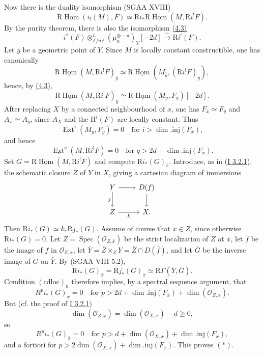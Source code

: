 \documentclass[11pt]{article}
\providecommand{\uH}{\underline{\mathrm H}}
\DeclareMathOperator{\Hom}{Hom}
\DeclareMathOperator{\Ext}{Ext}
\DeclareMathOperator{\Spec}{Spec}
\newcommand{\R}{\mathrm{R}}
\newcommand{\Z}{\mathbb{Z}}
\providecommand{\Hom}{\operatorname{Hom}}
\providecommand{\R}{\mathrm R}
\providecommand{\Z}{\mathbb Z}
\providecommand{\Spec}{\operatorname{Spec}}
\providecommand{\Spec}{\operatorname{Spec}}
\providecommand{\Hom}{\operatorname{Hom}}
\providecommand{\Spec}{\operatorname{Spec}}
\providecommand{\Spec}{\operatorname{Spec}}
\begin{document}
Now there is the duality isomorphism (SGAA XVIII)
\[
        \R\underline{\Hom}(i_!(M),F)\simeq \R i_*\R\underline{\Hom}(M,\R i^!F).
\]
By the purity theorem, there is also the isomorphism \hyperref[sga5:I:equation:4.3]{(4.3)}
\[
        i^*(F)\otimes^L_{\Z/n\Z}(\mu_n^{\otimes -d})_Y[-2d]\xrightarrow{\sim}\R i^!(F).
\]
Let $\bar{y}$ be a geometric point of $Y$. Since $M$ is locally constant constructible, one has canonically
\[
        \R\underline{\Hom}(M,\R i^!F)_{\bar{y}}\simeq \R\underline{\Hom}(M_{\bar{y}},(\R i^!F)_{\bar{y}}),
\]
hence, by \hyperref[sga5:I:equation:4.3]{(4.3)},
\[
        \R\underline{\Hom}(M,\R i^!F)_{\bar{y}}\simeq \R\underline{\Hom}(M_{\bar{y}},F_{\bar{y}})[-2d].
\]
After replacing $X$ by a connected neighbourhood of $x$, one has $F_{\bar{x}}\simeq F_{\bar{y}}$ and $A_{\bar{x}}\simeq A_{\bar{y}}$, since $A_X$ and the $\uH^i(F)$ are locally constant. Thus
\[
        \underline{\Ext}^i(M_{\bar{y}},F_{\bar{y}})=0\quad\text{for }i>\dim.\mathrm{inj}(F_{\bar{x}}),
\]
and hence
\[
        \underline{\Ext}^{q}(M,\R i^!F)=0\quad\text{for }q>2d+\dim.\mathrm{inj}(F_{\bar{x}}).
\]
Set $G=\R\underline{\Hom}(M,\R i^!F)$ and compute $\R i_*(G)_{\bar{x}}$. Introduce, as in (\hyperref[sga5:I:proposition:3.2.1]{I 3.2.1}), the schematic closure $Z$ of $Y$ in $X$, giving a cartesian diagram of immersions
\[
\begin{tikzcd}
Y \arrow[r] \arrow[d,"j"'] & D(f) \arrow[d]\\
Z \arrow[r,"k"'] & X.
\end{tikzcd}
\]
Then $\R i_*(G)\simeq k_*\R j_*(G)$. Assume of course that $x\in Z$, since otherwise $\R i_*(G)=0$. Let $\bar{Z}=\Spec(\mathcal{O}_{Z,\bar{x}})$ be the strict localization of $Z$ at $\bar{x}$, let $\bar{f}$ be the image of $f$ in $\mathcal{O}_{Z,\bar{x}}$, let $\bar{Y}=\bar{Z}\times_ZY=\bar{Z}\cap D(\bar{f})$, and let $\bar{G}$ be the inverse image of $G$ on $\bar{Y}$. By (SGAA VIII 5.2),
\[
        \R i_*(G)_{\bar{x}}=\R j_*(G)_{\bar{x}}\simeq \R\Gamma(\bar{Y},\bar{G}).
\]
Condition $(\mathrm{cdloc})_n$ therefore implies, by a spectral sequence argument, that
\[
        R^p i_*(G)_{\bar{x}}=0\quad\text{for }p>2d+\dim.\mathrm{inj}(F_{\bar{x}})+\dim(\mathcal{O}_{Z,x}).
\]
But (cf. the proof of \hyperref[sga5:I:proposition:3.2.1]{I 3.2.1})
\[
        \dim(\mathcal{O}_{Z,x})=\dim(\mathcal{O}_{X,x})-d\geq0,
\]
so
\[
        R^p i_*(G)_{\bar{x}}=0\quad\text{for }p>d+\dim(\mathcal{O}_{X,x})+\dim.\mathrm{inj}(F_{\bar{x}}),
\]
and a fortiori for $p>2\dim(\mathcal{O}_{X,x})+\dim.\mathrm{inj}(F_{\bar{x}})$. This proves $(*)$.
\end{document}
